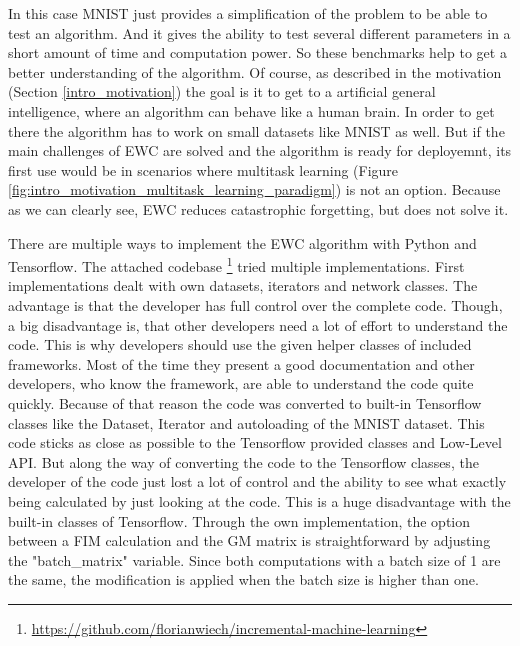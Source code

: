 In this case MNIST just provides a simplification of the problem to be able to test an algorithm.
And it gives the ability to test several different parameters in a short amount of time and computation power.
So these benchmarks help to get a better understanding of the algorithm.
Of course, as described in the motivation (Section \ref{intro_motivation}) the goal is it to get to a artificial general intelligence, where an algorithm can behave like a human brain.
In order to get there the algorithm has to work on small datasets like MNIST as well.
But if the main challenges of EWC are solved and the algorithm is ready for deployemnt, its first use would be in scenarios where multitask learning (Figure \ref{fig:intro_motivation_multitask_learning_paradigm}) is not an option.
Because as we can clearly see, EWC reduces catastrophic forgetting, but does not solve it.

There are multiple ways to implement the EWC algorithm with Python and Tensorflow.
The attached codebase \footnote{\url{https://github.com/florianwiech/incremental-machine-learning}} tried multiple implementations.
First implementations dealt with own datasets, iterators and network classes.
The advantage is that the developer has full control over the complete code.
Though, a big disadvantage is, that other developers need a lot of effort to understand the code.
This is why developers should use the given helper classes of included frameworks.
Most of the time they present a good documentation and other developers, who know the framework, are able to understand the code quite quickly.
Because of that reason the code was converted to built-in Tensorflow classes like the Dataset, Iterator and autoloading of the MNIST dataset.
This code sticks as close as possible to the Tensorflow provided classes and Low-Level API.
But along the way of converting the code to the Tensorflow classes, the developer of the code just lost a lot of control and the ability to see what exactly being calculated by just looking at the code.
This is a huge disadvantage with the built-in classes of Tensorflow.
\newline
Through the own implementation, the option between a FIM calculation and the GM matrix is straightforward by adjusting the "batch\_matrix" variable.
Since both computations with a batch size of 1 are the same, the modification is applied when the batch size is higher than one.

